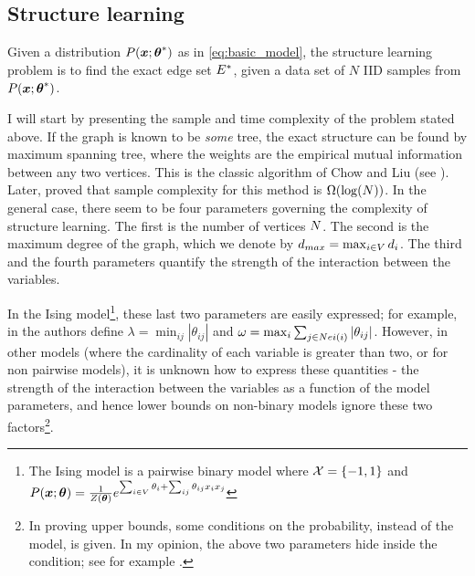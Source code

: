 \subsection{Structure learning}
\label{sec:structure}
Given a distribution $P(\boldsymbol{x};{\boldsymbol{\theta}}^{*})$ as in \eqref{eq:basic_model},
the structure learning problem is to find the exact edge set ${E}^{*}$, given a data set of $N$ IID samples from $P(\boldsymbol{x};{\boldsymbol{\theta}}^{*})$.

I will start by presenting the sample and time complexity of the problem stated above. 
If the graph is known to be {\em some} tree, the exact structure can be found by maximum spanning tree, where the weights are the empirical mutual information between any two vertices. This is the classic algorithm of Chow and Liu (see \cite{chowLiu}). Later, \cite{tan2011learning} proved that sample complexity for this method is $\Omega(\log({N}))$. In the general case, there seem to be four parameters governing the complexity of structure learning.
The first is the number of vertices $N$. The second is the maximum degree of the graph, which we denote by $d_{max} = \max_{i \in V} d_i$.
The third and the fourth parameters quantify the strength of the interaction between the variables.

In the Ising model\footnote{The Ising model is a pairwise binary model where ${\cal X} = \{-1,1\}$ and $P(\boldsymbol{x};\boldsymbol{\theta}) = \frac{1}{Z(\boldsymbol{\theta})} e^{\sum_{i \in V}\theta_i + \sum_{ij}\theta_{ij}x_ix_j}$}, these last two parameters are easily expressed; for example, in \cite{santhanam2012information} the authors define $\lambda =
\min_{ij} |\theta_{ij}|$ and $\omega = \max_i \sum_{j \in Nei(i)} |\theta_{ij}|$.  However, in other models (where the cardinality of each variable is greater than two, or for non pairwise models), it is unknown how to express these quantities - the strength of the interaction between the variables as a function of the model
parameters, and hence lower bounds on non-binary models ignore these two factors\footnote{In proving upper bounds, some conditions on the probability, instead of the model, is given. In my opinion, the above two parameters hide inside the condition; see for example \cite{bresler2008reconstruction}.}.

